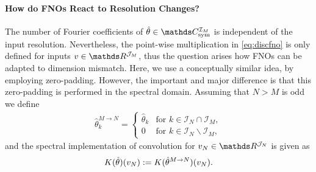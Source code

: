 \paragraph{How do FNOs React to Resolution Changes?}
%
The number of Fourier coefficients of $\hat\param\in\Csym^{\mathcal{I}_M}$ is independent of the input resolution. Nevertheless, the point-wise multiplication in \cref{eq:discfno} is only defined for inputs $\imgg\in\R^{\mathcal{J}_M}$, thus the question arises how FNOs can be adapted to dimension mismatch. Here, we use a conceptually similar idea, by employing zero-padding. However, the important and major difference is that this zero-padding is performed in the spectral domain. Assuming that $N>M$ is odd we define
%
%
\begin{align*}
\hat{\theta}^{M \rightarrow N}_k = \begin{cases}
\hat{\theta}_k & \text{for } k \in \mathcal{I}_N \cap \mathcal{I}_M,\\
0 & \text{for } k \in \mathcal{I}_N \backslash \mathcal{I}_M,
\end{cases}
\end{align*}
%
%
and the spectral implementation of convolution for $\imgg_N\in\R^{\mathcal{J}_N}$ is given as
%
%
\begin{equation*}
   K(\hat{\theta})(v_N) := K(\hat{\theta}^{M \rightarrow N})(v_N).
\end{equation*}
%
%
